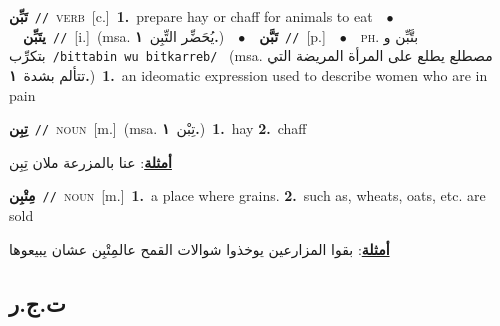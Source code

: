 \documentclass[10pt,a4paper,twoside]{article} %
\begin{document}
\begin{multicols}{2}
{{\setlength\topsep{0pt}\textbf{\foreignlanguage{arabic}{تَبِّن}}\ {\color{gray}\texttt{//}\color{black}}\ \textsc{verb}\ [c.]\ \textbf{1.}~prepare hay or chaff for animals to eat\ \ $\bullet$\ \ \setlength\topsep{0pt}\textbf{\foreignlanguage{arabic}{يتَبِّن}}\ {\color{gray}\texttt{//}\color{black}}\ [i.]\ \color{gray}(msa. \foreignlanguage{arabic}{يُحَضِّر التِّبِن}~\foreignlanguage{arabic}{\textbf{١.}})\color{black}\ \ $\bullet$\ \ \setlength\topsep{0pt}\textbf{\foreignlanguage{arabic}{تَبَّن}}\ {\color{gray}\texttt{//}\color{black}}\ [p.]\ \ $\bullet$\ \ \textsc{ph.} \color{gray} \foreignlanguage{arabic}{بتَّبِّن و بتكرِّب}\color{black}\ {\color{gray}\texttt{/{\sffamily bittabin wu bitkarreb}/}\color{black}}\ \color{gray} (msa. \foreignlanguage{arabic}{مصطلع يطلع على المرأة المريضة التي تتألم بشدة}~\foreignlanguage{arabic}{\textbf{١.}})\color{black}\ \textbf{1.}~an ideomatic expression used to describe women who are in pain\ 

{\setlength\topsep{0pt}\textbf{\foreignlanguage{arabic}{تِبِن}}\ {\color{gray}\texttt{//}\color{black}}\ \textsc{noun}\ [m.]\ \color{gray}(msa. \foreignlanguage{arabic}{تِبْن}~\foreignlanguage{arabic}{\textbf{١.}})\color{black}\ \textbf{1.}~hay  \textbf{2.}~chaff\  \begin{flushright}\color{gray}\foreignlanguage{arabic}{\textbf{\underline{\foreignlanguage{arabic}{أمثلة}}}: عنا بالمزرعة ملان تِبِن}\end{flushright}\color{black}} \vspace{2mm}

{\setlength\topsep{0pt}\textbf{\foreignlanguage{arabic}{مِتْبِن}}\ {\color{gray}\texttt{//}\color{black}}\ \textsc{noun}\ [m.]\ \textbf{1.}~a place where grains.  \textbf{2.}~such as, wheats, oats, etc. are sold\  \begin{flushright}\color{gray}\foreignlanguage{arabic}{\textbf{\underline{\foreignlanguage{arabic}{أمثلة}}}: بقوا المزارعين يوخذوا شوالات القمح عالمِتْبِن عشان يبيعوها}\end{flushright}\color{black}} \vspace{2mm}

\vspace{-3mm}
\subsection*{\color{blue}\foreignlanguage{arabic}{ت.ج.ر}\color{blue}{}} 

}}
\end{multicols}
\end{document}
